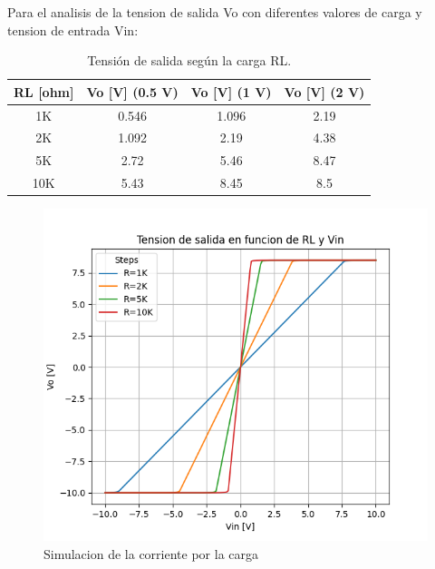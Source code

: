 Para el analisis de la tension de salida Vo con diferentes valores de carga y tension de entrada Vin:

\begin{table}[h!]
\centering
\begin{tabular}{|c|c|c|c|}
\hline
\textbf{RL [ohm]} & \textbf{Vo [V] (0.5 V)} & \textbf{Vo [V] (1 V)} & \textbf{Vo [V] (2 V)} \\ \hline
1K    & 0.546  & 1.096  & 2.19  \\ \hline
2K    & 1.092  & 2.19   & 4.38  \\ \hline
5K    & 2.72   & 5.46   & 8.47  \\ \hline
10K   & 5.43   & 8.45   & 8.5  \\ \hline
\end{tabular}
\caption{Tensión de salida según la carga RL.}
\label{tab:Vo_vs_RL}
\end{table}
\begin{figure}[h!]
    \centering
    \includegraphics[width=0.70\linewidth]{Secciones/Circuito2/TP1_2_Vo_vs_Vin_RL.png}
    \caption{Simulacion de la corriente por la carga}
\end{figure}






